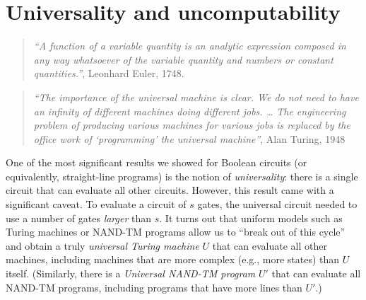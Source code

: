 \chapter{Universality and uncomputability}\label{chapcomputable}


\begin{quote}
\emph{``A function of a variable quantity is an analytic expression
composed in any way whatsoever of the variable quantity and numbers or
constant quantities.''}, Leonhard Euler, 1748.
\end{quote}

\begin{quote}
\emph{``The importance of the universal machine is clear. We do not need
to have an infinity of different machines doing different jobs. \ldots{}
The engineering problem of producing various machines for various jobs
is replaced by the office work of `programming' the universal
machine''}, Alan Turing, 1948
\end{quote}

One of the most significant results we showed for Boolean circuits (or
equivalently, straight-line programs) is the notion of
\emph{universality}: there is a single circuit that can evaluate all
other circuits. However, this result came with a significant caveat. To
evaluate a circuit of \(s\) gates, the universal circuit needed to use a
number of gates \emph{larger} than \(s\). It turns out that uniform
models such as Turing machines or NAND-TM programs allow us to ``break
out of this cycle'' and obtain a truly \emph{universal Turing machine}
\(U\) that can evaluate all other machines, including machines that are
more complex (e.g., more states) than \(U\) itself. (Similarly, there is
a \emph{Universal NAND-TM program} \(U'\) that can evaluate all NAND-TM
programs, including programs that have more lines than \(U'\).)

